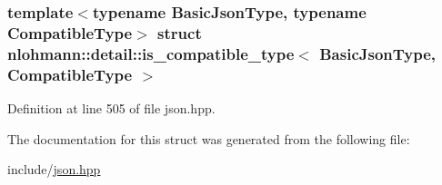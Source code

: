 \subsubsection*{template$<$typename Basic\+Json\+Type, typename Compatible\+Type$>$\newline
struct nlohmann\+::detail\+::is\+\_\+compatible\+\_\+type$<$ Basic\+Json\+Type, Compatible\+Type $>$}



Definition at line 505 of file json.\+hpp.



The documentation for this struct was generated from the following file\+:\begin{DoxyCompactItemize}
\item 
include/\hyperlink{json_8hpp}{json.\+hpp}\end{DoxyCompactItemize}

